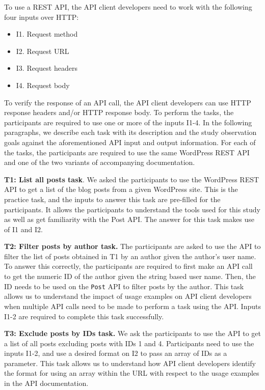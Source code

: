 To use a REST API, the API client developers need to work with the following four inputs over HTTP:

\begin{itemize}
  \item I1. Request method
  \item I2. Request URL
  \item I3. Request headers
  \item I4. Request body
\end{itemize}

To verify the response of an API call, the API client developers can use HTTP response headers and/or HTTP response body. To perform the tasks, the participants are required to use one or more of the inputs I1-4. In the following paragraphs, we describe each task with its description and the study observation goals against the aforementioned API input and output information. For each of the tasks, the participants are required to use the same WordPress REST API and one of the two variants of accompanying documentation.

\textbf{T1: List all posts task}. We asked the participants to use the WordPress REST API to get a list of the blog posts from a given WordPress site. This is the practice task, and the inputs to answer this task are pre-filled for the participants. It allows the participants to understand the tools used for this study as well as get familiarity with the Post API. The answer for this task makes use of I1 and I2.

\textbf{T2: Filter posts by author task.} The participants are asked to use the API to filter the list of posts obtained in T1 by an author given the author's user name. To answer this correctly, the participants are required to first make an API call to get the numeric ID of the author given the string based user name. Then, the ID needs to be used on the \lstinline{Post} API to filter posts by the author. This task allows us to understand the impact of usage examples on API client developers when multiple API calls need to be made to perform a task using the API. Inputs I1-2 are required to complete this task successfully.

\textbf{T3: Exclude posts by IDs task.} We ask the participants to use the API to get a list of all posts excluding posts with IDs 1 and 4. Participants need to use the inputs I1-2, and use a desired format on I2 to pass an array of IDs as a parameter. This task allows us to understand how API client developers identify the format for using an array within the URL with respect to the usage examples in the API documentation.

